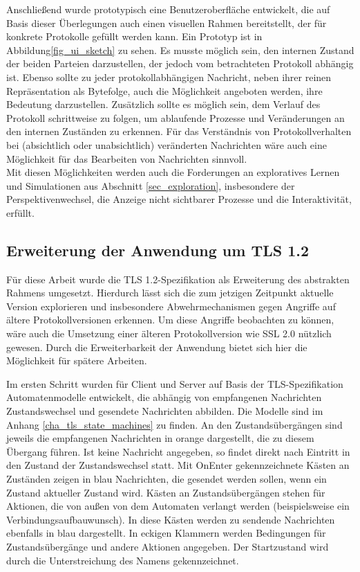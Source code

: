 Anschließend wurde prototypisch eine Benutzeroberfläche entwickelt, die auf Basis dieser Überlegungen auch einen visuellen Rahmen bereitstellt, der für konkrete Protokolle gefüllt werden kann. Ein Prototyp ist in Abbildung\ref{fig_ui_sketch} zu sehen. Es musste möglich sein, den internen Zustand der beiden Parteien darzustellen, der jedoch vom betrachteten Protokoll abhängig ist. Ebenso sollte zu jeder protokollabhängigen Nachricht, neben ihrer reinen Repräsentation als Bytefolge, auch die Möglichkeit angeboten werden, ihre Bedeutung darzustellen. Zusätzlich sollte es möglich sein, dem Verlauf des Protokoll schrittweise zu folgen, um ablaufende Prozesse und Veränderungen an den internen Zuständen zu erkennen. Für das Verständnis von Protokollverhalten bei (absichtlich oder unabsichtlich) veränderten Nachrichten wäre auch eine Möglichkeit für das Bearbeiten von Nachrichten sinnvoll.\\
Mit diesen Möglichkeiten werden auch die Forderungen an exploratives Lernen und Simulationen aus Abschnitt \ref{sec_exploration}, insbesondere der Perspektivenwechsel, die Anzeige nicht sichtbarer Prozesse und die Interaktivität, erfüllt.

\subsection{Erweiterung der Anwendung um TLS 1.2}
\label{sec_analysis_tls_plugin}

Für diese Arbeit wurde die TLS 1.2-Spezifikation als Erweiterung des abstrakten Rahmens umgesetzt. Hierdurch lässt sich die zum jetzigen Zeitpunkt aktuelle Version explorieren und insbesondere Abwehrmechanismen gegen Angriffe auf ältere Protokollversionen erkennen. Um diese Angriffe beobachten zu können, wäre auch die Umsetzung einer älteren Protokollversion wie SSL 2.0 nützlich gewesen. Durch die Erweiterbarkeit der Anwendung bietet sich hier die Möglichkeit für spätere Arbeiten.

Im ersten Schritt wurden für Client und Server auf Basis der TLS-Spezifikation Automatenmodelle entwickelt, die abhängig von empfangenen Nachrichten Zustandswechsel und gesendete Nachrichten abbilden. Die Modelle sind im Anhang \ref{cha_tls_state_machines} zu finden. An den Zustandsübergängen sind jeweils die empfangenen Nachrichten in orange dargestellt, die zu diesem Übergang führen. Ist keine Nachricht angegeben, so findet direkt nach Eintritt in den Zustand der Zustandswechsel statt. Mit OnEnter gekennzeichnete Kästen an Zuständen zeigen in blau Nachrichten, die gesendet werden sollen, wenn ein Zustand aktueller Zustand wird. Kästen an Zustandsübergängen stehen für Aktionen, die von außen von dem Automaten verlangt werden (beispielsweise ein Verbindungsaufbauwunsch). In diese Kästen werden zu sendende Nachrichten ebenfalls in blau dargestellt. In eckigen Klammern werden Bedingungen für Zustandsübergänge und andere Aktionen angegeben. Der Startzustand wird durch die Unterstreichung des Namens gekennzeichnet.
 
